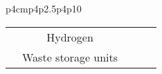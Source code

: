 \begin{landscape}
\begin{small}
\begin{longtable}{p{4cm}p{}p{}p{}p10}
\begin{tabular}{c|c|c|c|c}
                                                                                                 & Hydrogen                                                                                              &                                                                                                      &                                                                                              &                                                                                                                                                                                                                                                                                                                                                                                                                                                                                                                                                                                                                                                                                                                                                                                                                                                                                                                           \\
                                                                                                 & \multirow{2}{*}{Waste storage units}                                                                  &                                                                                                      &                                                                                              &                                                                                                                                                                                                                                                                                                                                                                                                                                                                                                                                                                                                                                                                                                                                                                                                                                                                                                                           \\

\end{tabular}
\end{longtable}
\end{small}
\end{landscape}
